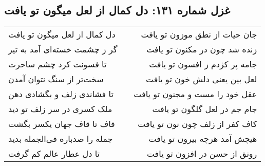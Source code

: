 \begin{center}
\section*{غزل شماره ۱۳۱: دل کمال از لعل میگون تو یافت}
\label{sec:131}
\begin{longtable}{l p{0.5cm} r}
دل کمال از لعل میگون تو یافت
&&
جان حیات از نطق موزون تو یافت
\\
گر ز چشمت خسته‌ای آمد به تیر
&&
زنده شد چون در مکنون تو یافت
\\
تا فسونت کرد چشم ساحرت
&&
جامه پر کژدم ز افسون تو یافت
\\
سخت‌تر از سنگ نتوان آمدن
&&
لعل بین یعنی دلش خون تو یافت
\\
تا فشاندی زلف و بگشادی دهن
&&
عقل خود را مست و مجنون تو یافت
\\
ملک کسری در سر زلف تو دید
&&
جام جم در لعل گلگون تو یافت
\\
قاف تا قاف جهان یکسر بگشت
&&
کاف کفر از زلف چون نون تو یافت
\\
جمله را صدباره فی‌الجمله بدید
&&
هیچش آمد هرچه بیرون تو یافت
\\
تا دل عطار عالم کم گرفت
&&
رونق از حسن در افزون تو یافت
\\
\end{longtable}
\end{center}
